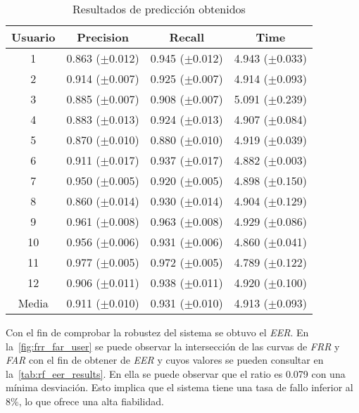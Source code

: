 \begin{table}[htbp!]
    \centering
    \begin{tabular}{c c c c}
        \toprule
        Usuario & Precision          & Recall             & Time               \\
        \midrule \midrule
        1 &  0.863 ($\pm$0.012) &  0.945 ($\pm$0.012) &  4.943 ($\pm$0.033) \\
        2 &  0.914 ($\pm$0.007) &  0.925 ($\pm$0.007) &  4.914 ($\pm$0.093) \\
        3 &  0.885 ($\pm$0.007) &  0.908 ($\pm$0.007) &  5.091 ($\pm$0.239) \\
        4 &  0.883 ($\pm$0.013) &  0.924 ($\pm$0.013) &  4.907 ($\pm$0.084) \\
        5 &  0.870 ($\pm$0.010) &  0.880 ($\pm$0.010) &  4.919 ($\pm$0.039) \\
        6 &  0.911 ($\pm$0.017) &  0.937 ($\pm$0.017) &  4.882 ($\pm$0.003) \\
        7 &  0.950 ($\pm$0.005) &  0.920 ($\pm$0.005) &  4.898 ($\pm$0.150) \\
        8 &  0.860 ($\pm$0.014) &  0.930 ($\pm$0.014) &  4.904 ($\pm$0.129) \\
        9 &  0.961 ($\pm$0.008) &  0.963 ($\pm$0.008) &  4.929 ($\pm$0.086) \\
        10 &  0.956 ($\pm$0.006) &  0.931 ($\pm$0.006) &  4.860 ($\pm$0.041) \\
        11 &  0.977 ($\pm$0.005) &  0.972 ($\pm$0.005) &  4.789 ($\pm$0.122) \\
        12 &  0.906 ($\pm$0.011) &  0.938 ($\pm$0.011) &  4.920 ($\pm$0.100) \\
        \midrule \midrule
        Media &  0.911 ($\pm$0.010) &  0.931 ($\pm$0.010) &  4.913 ($\pm$0.093) \\
        \bottomrule
    \end{tabular}

    \caption{Resultados de predicción obtenidos}
    \label{tab:rf_results}
\end{table}

Con el fin de comprobar la robustez del sistema se obtuvo el \textit{EER}. En la~\cref{fig:frr_far_user} se puede observar la intersección de las curvas de \textit{FRR} y \textit{FAR} con el fin de obtener de \textit{EER} y cuyos valores se pueden consultar en la~\cref{tab:rf_eer_results}. En ella se puede observar que el ratio es 0.079 con una mínima desviación. Esto implica que el sistema tiene una tasa de fallo inferior al 8\%, lo que ofrece una alta fiabilidad.

